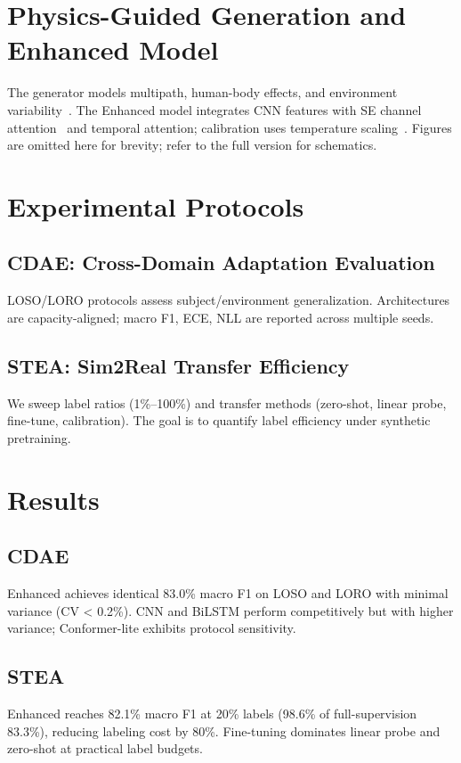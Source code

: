 \documentclass[journal]{IEEEtran}
\begin{document}
\section{Physics-Guided Generation and Enhanced Model}
The generator models multipath, human-body effects, and environment variability~\cite{goldsmith2005wireless}. The Enhanced model integrates CNN features with SE channel attention~\cite{se_networks2018} and temporal attention; calibration uses temperature scaling~\cite{calibration_guo2017}. Figures are omitted here for brevity; refer to the full version for schematics.

\section{Experimental Protocols}
\subsection{CDAE: Cross-Domain Adaptation Evaluation}
LOSO/LORO protocols assess subject/environment generalization. Architectures are capacity-aligned; macro F1, ECE, NLL are reported across multiple seeds.

\subsection{STEA: Sim2Real Transfer Efficiency}
We sweep label ratios (1\%–100\%) and transfer methods (zero-shot, linear probe, fine-tune, calibration). The goal is to quantify label efficiency under synthetic pretraining.

\section{Results}
\subsection{CDAE}
Enhanced achieves identical 83.0\% macro F1 on LOSO and LORO with minimal variance (CV < 0.2\%). CNN and BiLSTM perform competitively but with higher variance; Conformer-lite exhibits protocol sensitivity.

\subsection{STEA}
Enhanced reaches 82.1\% macro F1 at 20\% labels (98.6\% of full-supervision 83.3\%), reducing labeling cost by 80\%. Fine-tuning dominates linear probe and zero-shot at practical label budgets.
\end{document}
